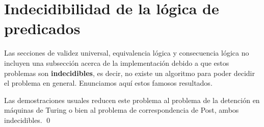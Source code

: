 \documentclass[11pt,letterpaper]{article}
\begin{document}





\section{Indecidibilidad de la lógica de predicados}


Las secciones de validez universal, equivalencia lógica y consecuencia lógica no 
incluyen una subsección acerca de la implementación debido a que estos problemas 
son \textbf{indecidibles}, es decir, no existe un algoritmo para poder decidir 
el problema en general. Enunciamos aquí estos famosos resultados.

\proof
Las demostraciones usuales reducen este problema al problema de la detención en máquinas de Turing o bien al problema de correspondencia de Post, ambos indecidibles.
\qed
\end{document}
